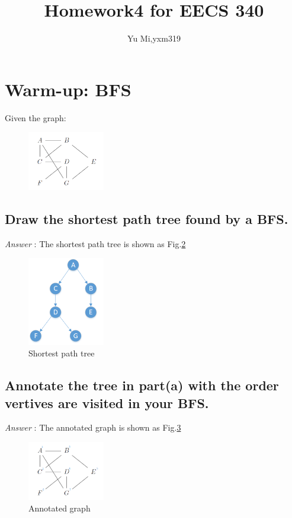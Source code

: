\documentclass[11pt]{article}
\begin{document}
	\title{Homework4 for EECS 340}
	\author{Yu Mi,yxm319}
	\maketitle
\section{Warm-up: BFS}
Given the graph:
\begin{figure}[h]
	\centering
	\includegraphics*[width=0.3\textwidth]{Figure/1.png}
	\label{fig:fig1}
\end{figure}
\subsection{Draw the shortest path tree found by a BFS.}
\noindent \emph{Answer} : The shortest path tree is shown as Fig.\ref{fig:fig2}
\begin{figure}[h]
	\centering
	\includegraphics[width=0.3\textwidth]{Figure/1_1.png}
	\caption{Shortest path tree}
	\label{fig:fig2}
\end{figure}
\subsection{Annotate the tree in part(a) with the order vertives are visited in your BFS.}
\noindent \emph{Answer} : The annotated graph is shown as Fig.\ref{fig:fig3}
\begin{figure}[h]
	\centering
	\includegraphics[width=0.3\textwidth]{Figure/1_2.png}
	\caption{Annotated graph}
	\label{fig:fig3}
\end{figure}
\end{document}
